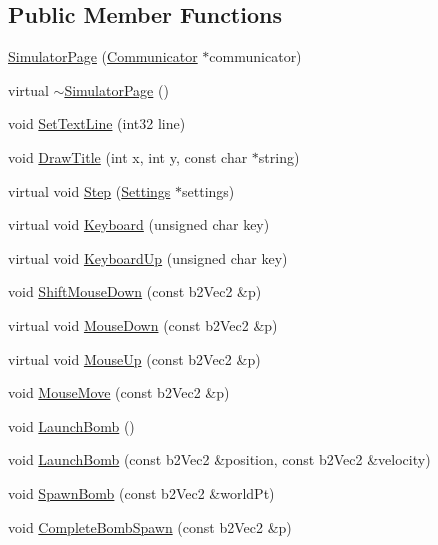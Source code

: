 \subsection*{Public Member Functions}
\begin{DoxyCompactItemize}
\item 
\hyperlink{classSimulatorPage_ae4c224aee18df3d96f37b54a0bf36464}{Simulator\-Page} (\hyperlink{classCommunicator}{Communicator} $\ast$communicator)
\item 
virtual \hyperlink{classSimulatorPage_af1468b91ff43c04bf51596769553ff5a}{$\sim$\-Simulator\-Page} ()
\item 
void \hyperlink{classSimulatorPage_af9089342514e16944fbc9f6202ed1439}{Set\-Text\-Line} (int32 line)
\item 
void \hyperlink{classSimulatorPage_a9bb317b7301bb3fddfd0bda065447d80}{Draw\-Title} (int x, int y, const char $\ast$string)
\item 
virtual void \hyperlink{classSimulatorPage_ac478dc8792d0f593c6dc6277a4e96719}{Step} (\hyperlink{structSettings}{Settings} $\ast$settings)
\item 
virtual void \hyperlink{classSimulatorPage_a295bcbd72dfe0dd651d922b8165e8f9a}{Keyboard} (unsigned char key)
\item 
virtual void \hyperlink{classSimulatorPage_af95e71d2e0b7bad8d0cdf7b7e5588440}{Keyboard\-Up} (unsigned char key)
\item 
void \hyperlink{classSimulatorPage_aa780589b43ed6c51d5d293b004dfd695}{Shift\-Mouse\-Down} (const b2\-Vec2 \&p)
\item 
virtual void \hyperlink{classSimulatorPage_ad6c49283fed786a374af8a3f236b2e29}{Mouse\-Down} (const b2\-Vec2 \&p)
\item 
virtual void \hyperlink{classSimulatorPage_afcc118e0e87b65a2c4bf95a76cec2396}{Mouse\-Up} (const b2\-Vec2 \&p)
\item 
void \hyperlink{classSimulatorPage_a71ff43bcbced024eaa85b037a9c22006}{Mouse\-Move} (const b2\-Vec2 \&p)
\item 
void \hyperlink{classSimulatorPage_a39e3534423f49c6f6f233b81f7f5bc80}{Launch\-Bomb} ()
\item 
void \hyperlink{classSimulatorPage_a99976c3f608eb764bee788460b2c0f8d}{Launch\-Bomb} (const b2\-Vec2 \&position, const b2\-Vec2 \&velocity)
\item 
void \hyperlink{classSimulatorPage_a177d0ac170bcdd4ec523ce0c99dec40d}{Spawn\-Bomb} (const b2\-Vec2 \&world\-Pt)
\item 
void \hyperlink{classSimulatorPage_a25475c39d60beeabfa7c5bf0f9bbaae9}{Complete\-Bomb\-Spawn} (const b2\-Vec2 \&p)

\end{DoxyCompactItemize}
